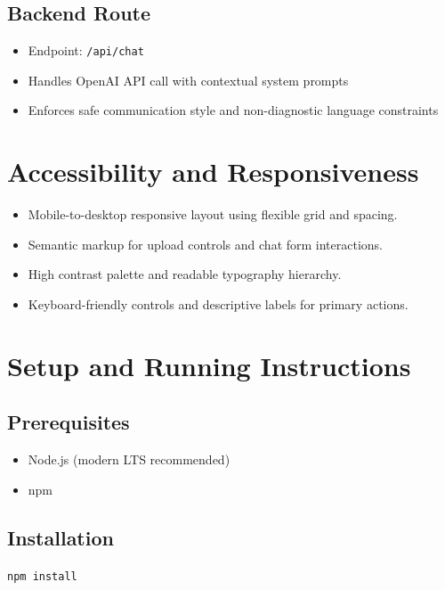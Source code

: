 \documentclass[12pt,a4paper]{article}
\begin{document}
\subsection{Backend Route}
\begin{itemize}[leftmargin=1.5em]
    \item Endpoint: \texttt{/api/chat}
    \item Handles OpenAI API call with contextual system prompts
    \item Enforces safe communication style and non-diagnostic language constraints
\end{itemize}

\section{Accessibility and Responsiveness}
\begin{itemize}[leftmargin=1.5em]
    \item Mobile-to-desktop responsive layout using flexible grid and spacing.
    \item Semantic markup for upload controls and chat form interactions.
    \item High contrast palette and readable typography hierarchy.
    \item Keyboard-friendly controls and descriptive labels for primary actions.
\end{itemize}

\section{Setup and Running Instructions}
\subsection{Prerequisites}
\begin{itemize}[leftmargin=1.5em]
    \item Node.js (modern LTS recommended)
    \item npm
\end{itemize}

\subsection{Installation}
\begin{tcolorbox}[colback=richblack,colframe=trustcyan,boxrule=0.6pt]
\texttt{npm install}
\end{tcolorbox}
\end{document}
